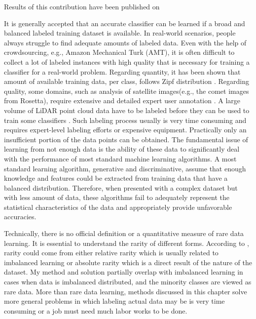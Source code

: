 \documentclass{iitthesis}
\begin{document}
Results of this contribution have been published on \cite{Zhang:2016:CCG:2983323.2983789}

\clearpage

 \label{chapter: data space}

 \label{dataspace: introduction}

It is generally accepted that an accurate classifier can be learned if a broad and balanced labeled training dataset is available. In real-world scenarios, people always struggle to find adequate amounts of labeled data. Even with the help of crowdsourcing, e.g., Amazon Mechanical Turk (AMT), it is often difficult to collect a lot of labeled instances with high quality that is necessary for training a classifier for a real-world problem. Regarding quantity, it has been shown that amount of available training data, per class, follows Zipf distribution \cite{torralba2011app_share}. Regarding quality, some domains, such as analysis of satellite images(e.g., the comet images from Rosetta), require extensive and detailed expert user annotation \cite{remotesensing2013}. A large volume of LiDAR point cloud data have to be labeled before they can be used to train some classifiers \cite{ZX:14}. Such labeling process usually is very time consuming and requires expert-level labeling efforts or expensive equipment. Practically only an insufficient portion of the data points can be obtained. The fundamental issue of learning from not enough data is the ability of these data to significantly deal with the performance of most standard machine learning algorithms. A most standard learning algorithm, generative and discriminative, assume that enough knowledge and features could be extracted from training data that have a balanced distribution. Therefore, when presented with a complex dataset but with less amount of data, these algorithms fail to adequately represent the statistical characteristics of the data and appropriately provide unfavorable accuracies.

Technically, there is no official definition or a quantitative measure of rare data learning. It is essential to understand the rarity of different forms. According to \cite{Weiss}, rarity could come from either relative rarity which is usually related to imbalanced learning or absolute rarity which is a direct result of the nature of the dataset. My method and solution partially overlap with imbalanced learning in cases when data is imbalanced distributed, and the minority classes are viewed as rare data. More than rare data learning, methods discussed in this chapter solve more general problems in which labeling actual data may be is very time consuming or a job must need much labor works to be done. 
\end{document}
